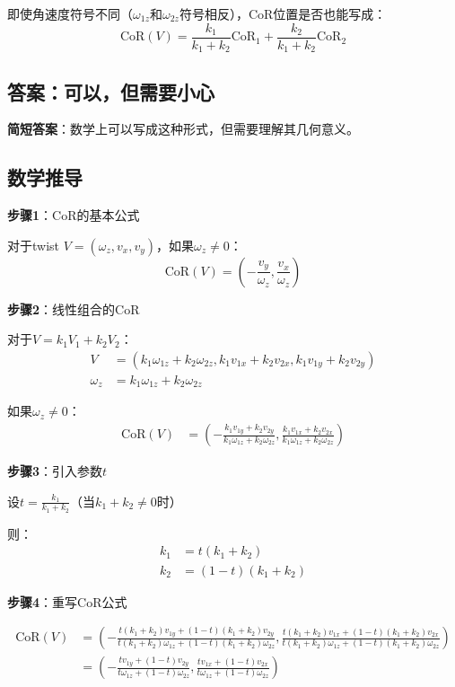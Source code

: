 \documentclass[12pt,a4paper]{article}
\begin{document}
即使角速度符号不同（$\omega_{1z}$和$\omega_{2z}$符号相反），CoR位置是否也能写成：
\begin{equation}
\text{CoR}(V) = \frac{k_1}{k_1 + k_2} \text{CoR}_1 + \frac{k_2}{k_1 + k_2} \text{CoR}_2
\label{eq:cor_convex}
\end{equation}

\subsection{答案：可以，但需要小心}

\textbf{简短答案}：数学上可以写成这种形式，但需要理解其几何意义。

\subsection{数学推导}

\textbf{步骤1}：CoR的基本公式

对于twist $V = (\omega_z, v_x, v_y)$，如果$\omega_z \neq 0$：
\begin{equation}
\text{CoR}(V) = \left(-\frac{v_y}{\omega_z}, \frac{v_x}{\omega_z}\right)
\end{equation}

\textbf{步骤2}：线性组合的CoR

对于$V = k_1 V_1 + k_2 V_2$：
\begin{align}
V &= (k_1 \omega_{1z} + k_2 \omega_{2z}, k_1 v_{1x} + k_2 v_{2x}, k_1 v_{1y} + k_2 v_{2y}) \\
\omega_z &= k_1 \omega_{1z} + k_2 \omega_{2z}
\end{align}

如果$\omega_z \neq 0$：
\begin{align}
\text{CoR}(V) &= \left(-\frac{k_1 v_{1y} + k_2 v_{2y}}{k_1 \omega_{1z} + k_2 \omega_{2z}}, \frac{k_1 v_{1x} + k_2 v_{2x}}{k_1 \omega_{1z} + k_2 \omega_{2z}}\right)
\end{align}

\textbf{步骤3}：引入参数$t$

设$t = \frac{k_1}{k_1 + k_2}$（当$k_1 + k_2 \neq 0$时）

则：
\begin{align}
k_1 &= t(k_1 + k_2) \\
k_2 &= (1-t)(k_1 + k_2)
\end{align}

\textbf{步骤4}：重写CoR公式

\begin{align}
\text{CoR}(V) &= \left(-\frac{t(k_1+k_2) v_{1y} + (1-t)(k_1+k_2) v_{2y}}{t(k_1+k_2) \omega_{1z} + (1-t)(k_1+k_2) \omega_{2z}}, \frac{t(k_1+k_2) v_{1x} + (1-t)(k_1+k_2) v_{2x}}{t(k_1+k_2) \omega_{1z} + (1-t)(k_1+k_2) \omega_{2z}}\right) \\
&= \left(-\frac{t v_{1y} + (1-t) v_{2y}}{t \omega_{1z} + (1-t) \omega_{2z}}, \frac{t v_{1x} + (1-t) v_{2x}}{t \omega_{1z} + (1-t) \omega_{2z}}\right)
\end{align}
\end{document}
